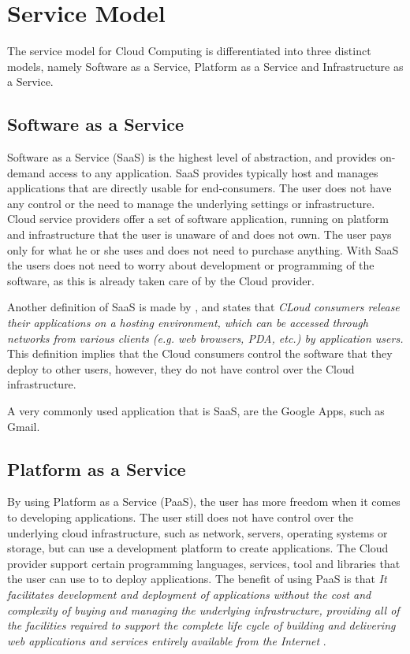 \section{Service Model}
The service model for Cloud Computing is differentiated into three distinct models, namely Software as a Service, Platform as a Service and Infrastructure as a Service.  

\subsection{Software as a Service}
Software as a Service (SaaS) is the highest level of abstraction, and provides on-demand access to any application. SaaS provides typically host and manages applications that are directly usable for end-consumers. The user does not have any control or the need to manage the underlying settings or infrastructure. Cloud service providers offer a set of software application, running on platform and infrastructure that the user is unaware of and does not own. The user pays only for what he or she uses and does not need to purchase anything. With SaaS the users does not need to worry about development or programming of the software, as this is already taken care of by the Cloud provider. 

Another definition of SaaS is made by \cite{DillonWuChang}, and states that \textit{CLoud consumers release their applications on a hosting environment, which can be accessed through networks from various clients (e.g. web browsers, PDA, etc.) by application users.} This definition implies that the Cloud consumers control the software that they deploy to other users, however, they do not have control over the Cloud infrastructure. 

A very commonly used application that is SaaS, are the Google Apps, such as Gmail. 

\subsection{Platform as a Service}
By using Platform as a Service (PaaS), the user has more freedom when it comes to developing applications. The user still does not have control over the underlying cloud infrastructure, such as network, servers, operating systems or storage, but can use a development platform to create applications. The Cloud provider support certain programming languages, services, tool and libraries that the user can use to to deploy applications. The benefit of using PaaS is that \textit{It facilitates development and deployment of applications without the cost and complexity of buying and managing the underlying infrastructure, providing all of the facilities required to support the complete life cycle of building and delivering web applications and services entirely available from the Internet} \cite{BhardwajJain}.


